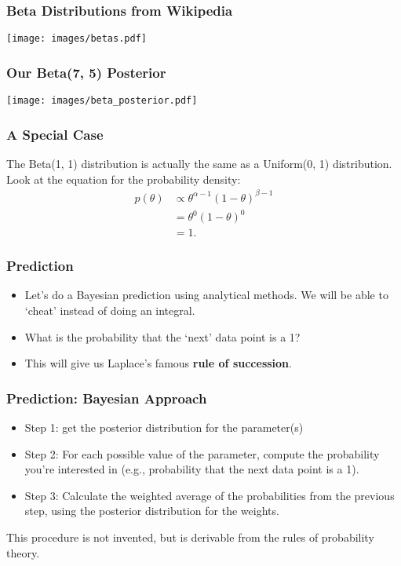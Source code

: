 \documentclass{beamer}
\begin{document}
\begin{frame}
\frametitle{Beta Distributions from Wikipedia}

\begin{center}
\texttt{[image: images/betas.pdf]}
\end{center}

\end{frame}

\begin{frame}
\frametitle{Our Beta(7, 5) Posterior}

\begin{center}
\texttt{[image: images/beta\_posterior.pdf]}
\end{center}

\end{frame}

\begin{frame}
\frametitle{A Special Case}
The Beta(1, 1) distribution is actually the same as a Uniform(0, 1)
distribution. Look at the equation for the probability density:
\begin{align}
p(\theta) &\propto \theta^{\alpha-1}(1-\theta)^{\beta - 1} \\
          &= \theta^{0}(1-\theta)^{0} \\
          &= 1.
\end{align}

\end{frame}



\begin{frame}
\frametitle{Prediction}

\begin{itemize}
\item Let's do a Bayesian prediction using analytical methods. We will be
able to `cheat' instead of doing an integral.\pause
\item What is the probability that the `next' data point is a 1?\pause
\item This will give us Laplace's famous {\bf rule of succession}.
\end{itemize}

\end{frame}

\begin{frame}
\frametitle{Prediction: Bayesian Approach}

\begin{itemize}
\item Step 1: get the posterior distribution for the parameter(s)\pause
\item Step 2: For each possible value of the parameter, compute the probability
you're interested in (e.g., probability that the next data point is a 1).\pause
\item Step 3: Calculate the weighted average of the probabilities from the previous
step, using the posterior distribution for the weights.\pause
\end{itemize}

This procedure is not invented, but is derivable from the rules of
probability theory.

\end{frame}
\end{document}
